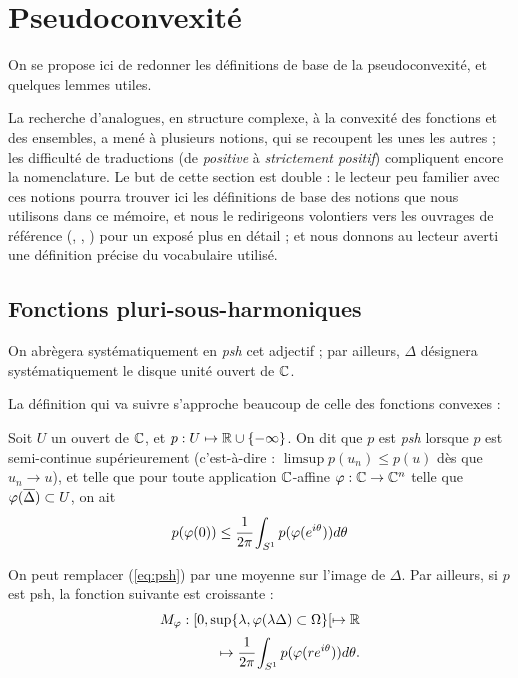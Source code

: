 \section{Pseudoconvexité}

On se propose ici de redonner les définitions de base de la pseudoconvexité, et quelques lemmes utiles.

La recherche d'analogues, en structure complexe, à la convexité des fonctions et des ensembles, a mené à plusieurs notions, qui se recoupent les unes les autres ; les difficulté de traductions (de \emph{positive} à \emph{strictement positif}) compliquent encore la nomenclature. Le but de cette section est double : le lecteur peu familier avec ces notions pourra trouver ici les définitions de base des notions que nous utilisons dans ce mémoire, et nous le redirigeons volontiers vers les ouvrages de référence (\cite{krantz1992partial}, \cite{voisin2002theorie}, \cite{demailly1997complex}) pour un exposé plus en détail ; et nous donnons au lecteur averti une définition précise du vocabulaire utilisé.

\subsection{Fonctions pluri-sous-harmoniques}
On abrègera systématiquement en \emph{psh} cet adjectif ; par ailleurs, $\Delta$ désignera systématiquement le disque unité ouvert de $\mathbb{C}$.

La définition qui va suivre s'approche beaucoup de celle des fonctions convexes :
\begin{defn}
	Soit $U$ un ouvert de $\mathbb{C}$, et $p:U\mapsto \mathbb{R} \cup \{-\infty \}$. On dit que $p$ est \emph{psh} lorsque $p$ est semi-continue supérieurement (c'est-à-dire : $\limsup p(u_n) \leq p(u)$ dès que $u_n \to u$), et telle que pour toute application $\mathbb{C}$-affine $\varphi : \mathbb{C} \to \mathbb{C}^n$ telle que $\varphi(\overline{\Delta}) \subset U$, on ait 
	\begin{equation}
		\label{eq:psh}
		p(\varphi(0)) \leq \cfrac{1}{2\pi}\int_{S^1}p(\varphi(e^{i\theta}))d\theta
	\end{equation}
\end{defn}
\begin{rem}
	On peut remplacer (\ref{eq:psh}) par une moyenne sur l'image de $\Delta$. Par ailleurs, si $p$ est psh, la fonction suivante est croissante :
	\begin{align*}
		M_{\varphi} : [0,\sup\{\lambda,\varphi(\lambda\Delta)\subset \Omega\}[ \mapsto \mathbb{R}\\
		 \mapsto \cfrac{1}{2\pi}\int_{S^1}p(\varphi(re^{i\theta}))d\theta.
	\end{align*}
\end{rem}

